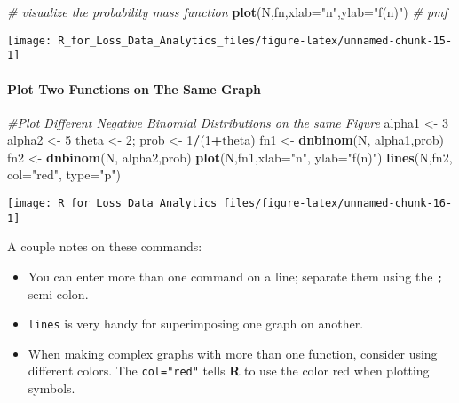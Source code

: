 \documentclass[]{book}
\newenvironment{Shaded}{\begin{snugshade}}{\end{snugshade}}
\newcommand{\KeywordTok}[1]{\textcolor[rgb]{0.13,0.29,0.53}{\textbf{#1}}}
\newcommand{\DataTypeTok}[1]{\textcolor[rgb]{0.13,0.29,0.53}{#1}}
\newcommand{\DecValTok}[1]{\textcolor[rgb]{0.00,0.00,0.81}{#1}}
\newcommand{\StringTok}[1]{\textcolor[rgb]{0.31,0.60,0.02}{#1}}
\newcommand{\CommentTok}[1]{\textcolor[rgb]{0.56,0.35,0.01}{\textit{#1}}}
\newcommand{\OperatorTok}[1]{\textcolor[rgb]{0.81,0.36,0.00}{\textbf{#1}}}
\newcommand{\NormalTok}[1]{#1}
\providecommand{\tightlist}{%
  \setlength{\itemsep}{0pt}\setlength{\parskip}{0pt}}
\let\oldparagraph\paragraph
\renewcommand{\paragraph}[1]{\oldparagraph{#1}\mbox{}}
\theoremstyle{definition}
\theoremstyle{definition}
\theoremstyle{definition}
\theoremstyle{remark}
\begin{document}
\begin{Shaded}
\begin{Highlighting}[]
\CommentTok{# visualize the probability mass function}
\KeywordTok{plot}\NormalTok{(N,fn,}\DataTypeTok{xlab=}\StringTok{"n"}\NormalTok{,}\DataTypeTok{ylab=}\StringTok{"f(n)"}\NormalTok{) }\CommentTok{# pmf}
\end{Highlighting}
\end{Shaded}

\begin{center}\texttt{[image: R\_for\_Loss\_Data\_Analytics\_files/figure-latex/unnamed-chunk-15-1]} \end{center}

\paragraph{Plot Two Functions on The Same
Graph}\label{plot-two-functions-on-the-same-graph}

\begin{Shaded}
\begin{Highlighting}[]
\CommentTok{#Plot Different Negative Binomial Distributions on the same Figure}
\NormalTok{alpha1 <-}\StringTok{ }\DecValTok{3}
\NormalTok{alpha2 <-}\StringTok{ }\DecValTok{5}
\NormalTok{theta <-}\StringTok{ }\DecValTok{2}\NormalTok{; prob <-}\StringTok{ }\DecValTok{1}\OperatorTok{/}\NormalTok{(}\DecValTok{1}\OperatorTok{+}\NormalTok{theta)}
\NormalTok{fn1 <-}\StringTok{ }\KeywordTok{dnbinom}\NormalTok{(N, alpha1,prob)}
\NormalTok{fn2 <-}\StringTok{ }\KeywordTok{dnbinom}\NormalTok{(N, alpha2,prob)}
\KeywordTok{plot}\NormalTok{(N,fn1,}\DataTypeTok{xlab=}\StringTok{"n"}\NormalTok{, }\DataTypeTok{ylab=}\StringTok{"f(n)"}\NormalTok{)}
\KeywordTok{lines}\NormalTok{(N,fn2, }\DataTypeTok{col=}\StringTok{"red"}\NormalTok{, }\DataTypeTok{type=}\StringTok{"p"}\NormalTok{)}
\end{Highlighting}
\end{Shaded}

\begin{center}\texttt{[image: R\_for\_Loss\_Data\_Analytics\_files/figure-latex/unnamed-chunk-16-1]} \end{center}

A couple notes on these commands:

\begin{itemize}
\tightlist
\item
  You can enter more than one command on a line; separate them using the
  \texttt{;} semi-colon.
\item
  \texttt{lines} is very handy for superimposing one graph on another.
\item
  When making complex graphs with more than one function, consider using
  different colors. The \texttt{col="red"} tells \textbf{R} to use the
  color red when plotting symbols.
\end{itemize}
\end{document}
